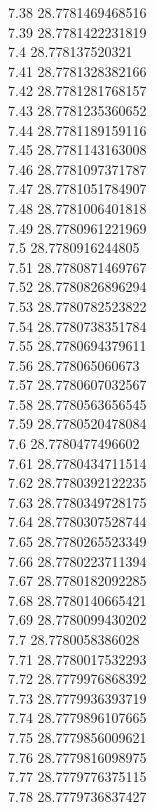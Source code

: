 {7.38	28.7781469468516\\
7.39	28.7781422231819\\
7.4	28.778137520321\\
7.41	28.7781328382166\\
7.42	28.7781281768157\\
7.43	28.7781235360652\\
7.44	28.7781189159116\\
7.45	28.7781143163008\\
7.46	28.7781097371787\\
7.47	28.7781051784907\\
7.48	28.7781006401818\\
7.49	28.7780961221969\\
7.5	28.7780916244805\\
7.51	28.7780871469767\\
7.52	28.7780826896294\\
7.53	28.7780782523822\\
7.54	28.7780738351784\\
7.55	28.7780694379611\\
7.56	28.778065060673\\
7.57	28.7780607032567\\
7.58	28.7780563656545\\
7.59	28.7780520478084\\
7.6	28.7780477496602\\
7.61	28.7780434711514\\
7.62	28.7780392122235\\
7.63	28.7780349728175\\
7.64	28.7780307528744\\
7.65	28.7780265523349\\
7.66	28.7780223711394\\
7.67	28.7780182092285\\
7.68	28.7780140665421\\
7.69	28.7780099430202\\
7.7	28.7780058386028\\
7.71	28.7780017532293\\
7.72	28.7779976868392\\
7.73	28.7779936393719\\
7.74	28.7779896107665\\
7.75	28.7779856009621\\
7.76	28.7779816098975\\
7.77	28.7779776375115\\
7.78	28.7779736837427\\
}
